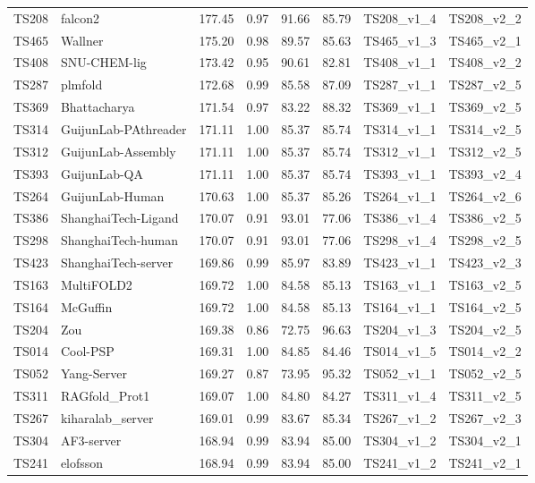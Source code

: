 \begin{longtable}{llllllll}
TS208 & falcon2 & 177.45 & 0.97 & 91.66 & 85.79 & TS208\_v1\_4 & TS208\_v2\_2 \\ 
TS465 & Wallner & 175.20 & 0.98 & 89.57 & 85.63 & TS465\_v1\_3 & TS465\_v2\_1 \\ 
TS408 & SNU-CHEM-lig & 173.42 & 0.95 & 90.61 & 82.81 & TS408\_v1\_1 & TS408\_v2\_2 \\ 
TS287 & plmfold & 172.68 & 0.99 & 85.58 & 87.09 & TS287\_v1\_1 & TS287\_v2\_5 \\ 
TS369 & Bhattacharya & 171.54 & 0.97 & 83.22 & 88.32 & TS369\_v1\_1 & TS369\_v2\_5 \\ 
TS314 & GuijunLab-PAthreader & 171.11 & 1.00 & 85.37 & 85.74 & TS314\_v1\_1 & TS314\_v2\_5 \\ 
TS312 & GuijunLab-Assembly & 171.11 & 1.00 & 85.37 & 85.74 & TS312\_v1\_1 & TS312\_v2\_5 \\ 
TS393 & GuijunLab-QA & 171.11 & 1.00 & 85.37 & 85.74 & TS393\_v1\_1 & TS393\_v2\_4 \\ 
TS264 & GuijunLab-Human & 170.63 & 1.00 & 85.37 & 85.26 & TS264\_v1\_1 & TS264\_v2\_6 \\ 
TS386 & ShanghaiTech-Ligand & 170.07 & 0.91 & 93.01 & 77.06 & TS386\_v1\_4 & TS386\_v2\_5 \\ 
TS298 & ShanghaiTech-human & 170.07 & 0.91 & 93.01 & 77.06 & TS298\_v1\_4 & TS298\_v2\_5 \\ 
TS423 & ShanghaiTech-server & 169.86 & 0.99 & 85.97 & 83.89 & TS423\_v1\_1 & TS423\_v2\_3 \\ 
TS163 & MultiFOLD2 & 169.72 & 1.00 & 84.58 & 85.13 & TS163\_v1\_1 & TS163\_v2\_5 \\ 
TS164 & McGuffin & 169.72 & 1.00 & 84.58 & 85.13 & TS164\_v1\_1 & TS164\_v2\_5 \\ 
TS204 & Zou & 169.38 & 0.86 & 72.75 & 96.63 & TS204\_v1\_3 & TS204\_v2\_5 \\ 
TS014 & Cool-PSP & 169.31 & 1.00 & 84.85 & 84.46 & TS014\_v1\_5 & TS014\_v2\_2 \\ 
TS052 & Yang-Server & 169.27 & 0.87 & 73.95 & 95.32 & TS052\_v1\_1 & TS052\_v2\_5 \\ 
TS311 & RAGfold\_Prot1 & 169.07 & 1.00 & 84.80 & 84.27 & TS311\_v1\_4 & TS311\_v2\_5 \\ 
TS267 & kiharalab\_server & 169.01 & 0.99 & 83.67 & 85.34 & TS267\_v1\_2 & TS267\_v2\_3 \\ 
TS304 & AF3-server & 168.94 & 0.99 & 83.94 & 85.00 & TS304\_v1\_2 & TS304\_v2\_1 \\ 
TS241 & elofsson & 168.94 & 0.99 & 83.94 & 85.00 & TS241\_v1\_2 & TS241\_v2\_1 \\ 

\end{longtable}
